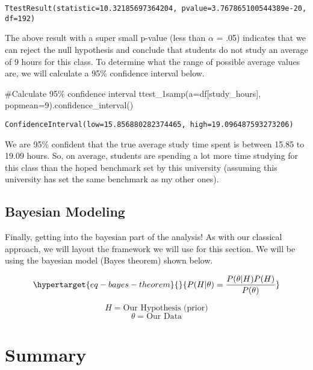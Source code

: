 \documentclass[
  letterpaper,
  DIV=11,
  numbers=noendperiod]{scrreprt}
\newenvironment{Shaded}{\begin{snugshade}}{\end{snugshade}}
\newcommand{\CommentTok}[1]{\textcolor[rgb]{0.37,0.37,0.37}{#1}}
\newcommand{\DecValTok}[1]{\textcolor[rgb]{0.68,0.00,0.00}{#1}}
\newcommand{\NormalTok}[1]{\textcolor[rgb]{0.00,0.23,0.31}{#1}}
\newcommand{\OperatorTok}[1]{\textcolor[rgb]{0.37,0.37,0.37}{#1}}
\newcommand{\StringTok}[1]{\textcolor[rgb]{0.13,0.47,0.30}{#1}}
\begin{document}
\begin{verbatim}
TtestResult(statistic=10.32185697364204, pvalue=3.767865100544389e-20, df=192)
\end{verbatim}

The above result with a super small p-value (less than \(\alpha\) = .05)
indicates that we can reject the null hypothesis and conclude that
students do not study an average of 9 hours for this class. To determine
what the range of possible average values are, we will calculate a 95\%
confidence interval below.

\begin{Shaded}
\begin{Highlighting}[]
\CommentTok{\#Calculate 95\% confidence interval}
\NormalTok{ttest\_1samp(a}\OperatorTok{=}\NormalTok{df[}\StringTok{\textquotesingle{}study\_hours\textquotesingle{}}\NormalTok{], popmean}\OperatorTok{=}\DecValTok{9}\NormalTok{).confidence\_interval()}
\end{Highlighting}
\end{Shaded}

\begin{verbatim}
ConfidenceInterval(low=15.856880282374465, high=19.096487593273206)
\end{verbatim}

We are 95\% confident that the true average study time spent is between
15.85 to 19.09 hours. So, on average, students are spending a lot more
time studying for this class than the hoped benchmark set by this
university (assuming this university has set the same benchmark as my
other ones).

\hypertarget{bayesian-modeling}{%
\section{Bayesian Modeling}\label{bayesian-modeling}}

Finally, getting into the bayesian part of the analysis! As with our
classical approach, we will layout the framework we will use for this
section. We will be using the bayesian model (Bayes theorem) shown
below.

\begin{equation}\protect\hypertarget{eq-bayes-theorem}{}{P(H|\theta) = \frac{P(\theta|H) P(H)}{P(\theta)}}\label{eq-bayes-theorem}\end{equation}

\[H = \text{Our Hypothesis (prior)}\] \[\theta = \text{Our Data}\]

\hypertarget{summary}{%
\chapter{Summary}\label{summary}}
\end{document}
